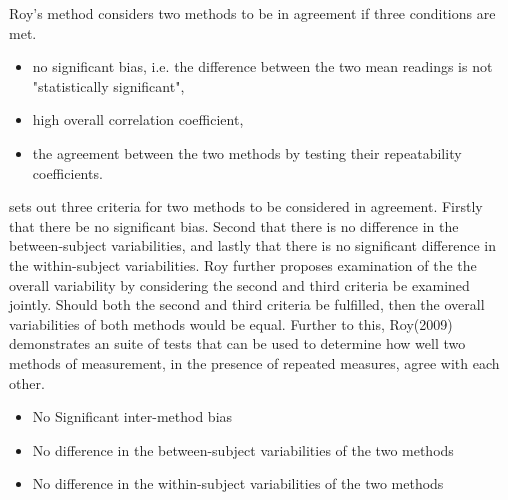 \documentclass[12pt, a4paper]{report}
\theoremstyle{plain}
\theoremstyle{definition}
\theoremstyle{remark}
\begin{document}
Roy's method considers two methods to be in agreement if three
conditions are met.

\begin{itemize}
	\item no significant bias, i.e. the difference between the two
	mean readings is not "statistically significant",
	
	\item high overall correlation coefficient,
	
	\item the agreement between the two methods by testing their
	repeatability coefficients.
	
\end{itemize}


%
%
\citet{ARoy2009} sets out three criteria for two methods to be considered in agreement. Firstly that there be no significant bias. Second that there is no difference in the between-subject variabilities, and lastly that there is no significant difference in the within-subject variabilities. Roy further proposes examination of the the overall variability by considering the second and third criteria be examined jointly. Should both the second and third criteria be fulfilled, then the overall variabilities of both methods would be equal.
Further to this, Roy(2009) demonstrates an suite of tests that can be used to determine how well two methods of measurement, in the presence of repeated measures, agree with each other.

\begin{itemize}\itemsep0.5cm
	\item No Significant inter-method bias
	\item No difference in the between-subject variabilities of the two methods
	\item No difference in the within-subject variabilities of the two methods
\end{itemize}
\end{document}
